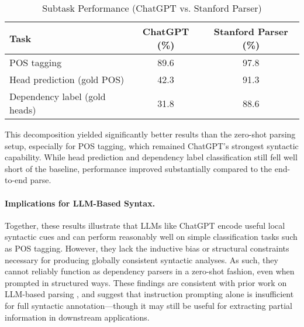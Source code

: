 \begin{table}[h]
\centering
\caption{Subtask Performance (ChatGPT vs. Stanford Parser)}
\label{tab:subtasks}
\begin{tabular}{lcc}
\toprule
\textbf{Task} & \textbf{ChatGPT (\%)} & \textbf{Stanford Parser (\%)} \\
\midrule
POS tagging & 89.6 & 97.8 \\
Head prediction (gold POS) & 42.3 & 91.3 \\
Dependency label (gold heads) & 31.8 & 88.6 \\
\bottomrule
\end{tabular}
\end{table}

This decomposition yielded significantly better results than the zero-shot parsing setup, especially for POS tagging, which remained ChatGPT’s strongest syntactic capability. While head prediction and dependency label classification still fell well short of the baseline, performance improved substantially compared to the end-to-end parse.

\paragraph{Implications for LLM-Based Syntax.}
Together, these results illustrate that LLMs like ChatGPT encode useful local syntactic cues and can perform reasonably well on simple classification tasks such as POS tagging. However, they lack the inductive bias or structural constraints necessary for producing globally consistent syntactic analyses. As such, they cannot reliably function as dependency parsers in a zero-shot fashion, even when prompted in structured ways. These findings are consistent with prior work on LLM-based parsing \cite{kulmizev2022lmparse, muller2023syntax}, and suggest that instruction prompting alone is insufficient for full syntactic annotation—though it may still be useful for extracting partial information in downstream applications.
